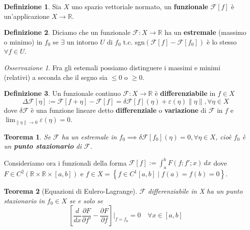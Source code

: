 \documentclass{book}
\theoremstyle{plain}
\newtheorem*{teo*}{Teorema}
\theoremstyle{plain}
\theoremstyle{plain}
\theoremstyle{plain}
\theoremstyle{plain}
\theoremstyle{definition}
\newtheorem*{defi*}{Definizione}
\theoremstyle{remark}
\newtheorem*{oss}{Osservazione}
\theoremstyle{definition}
\begin{document}
\begin{defi*}
    Sia $X$ uno spazio vettoriale normato, un \textbf{funzionale} $\mathcal{F}[f]$ è un'applicazione $X\to\mathbb{R}$.
\end{defi*}

\begin{defi*}
    Diciamo che un funzionale $\mathcal{F}: X\to\mathbb{R}$ ha un \textbf{estremale} (massimo o minimo) in $f_0$ se $\exists$ un intorno $U$ di $f_0$ t.c. sgn$(\mathcal{F}[f]-\mathcal{F}[f_0])$ è lo stesso $\forall f \in U$.
\end{defi*}

\begin{oss}
    Fra gli estemali possiamo distinguere i massimi e minimi (relativi) a seconda che il segno sia $\leq0$ o $\geq 0$.
\end{oss}

\begin{defi*}
    Un funzionale continuo $\mathcal{F}: X\to\mathbb{R}$ è \textbf{differenziabile} in $f \in X$
    \begin{displaymath}
        \Delta\mathcal{F}[\eta]:= \mathcal{F}[f+\eta]-\mathcal{F}[f] = \delta\mathcal{F}[f](\eta) + \varepsilon(\eta)\lVert\eta\rVert, \forall \eta \in X
    \end{displaymath}
    dove $\delta\mathcal{F}$ è una funzione lineare detto \textbf{differenziale} o \textbf{variazione} di $\mathcal{F}$ in $f$ e $\lim_{\lVert\eta\rVert\to 0}\varepsilon(\eta)=0$.
\end{defi*}

\begin{teo*}
    Se $\mathcal{F}$ ha un estremale in $f_0\implies\delta\mathcal{F}[f_0](\eta)=0, \forall \eta \in X$, cioè $f_0$ è un \textbf{punto stazionario} di $\mathcal{F}$.
\end{teo*}

\noindent Consideriamo ora i funzionali della forma $\mathcal{F}[f]:=\int_a^bF(f;f';x)\,dx$ dove $F\in C^2(\mathbb{R}\times\mathbb{R}\times[a, b])$ e $f\in X=\left\{f\in C^1[a,b] \; | \; f(a)=f(b)=0\right\}$.

\begin{teo*}[Equazioni di Eulero-Lagrange]
    $\mathcal{F}$ differenziabile in X ha un punto stazionario in $f_0\in X$ se e solo se
    \begin{displaymath}
        \boxed{
        \left[\frac{d}{dx}\frac{\partial F}{\partial f'}-\frac{\partial F}{\partial f}\right]\bigg|_{f=f_0}=0 \quad \forall x \in [a,b]
        }
    \end{displaymath}
\end{teo*}
\end{document}
